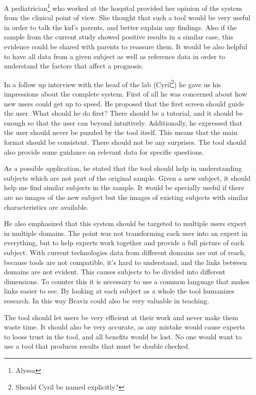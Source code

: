 A pediatrician\footnote{Alyssa} who worked at the hospital provided her opinion of the system from the clinical point of view. She thought that such a tool would be very useful in order to talk the kid's parents, and better explain any findings. Also if the sample from the current study showed positive results in a similar case, this evidence could be shared with parents to reassure them. It would be also helpful to have all data from a given subject as well as reference data in order to understand the factors that affect a prognosis. 


In a follow up interview with the head of the lab (Cyril\footnote{Should Cyril be named explicitly?}) he gave us his impressions about the complete system. First of all he was concerned about how new users could get up to speed. He proposed that the first screen should guide the user. What should he do first? There should be a tutorial, and it should be enough so that the user can beyond intuitively. Additionally, he expressed that the user should never be puzzled by the tool itself. This means that the main format should be consistent. There should not be any surprises. The tool should also provide some guidance on relevant data for specific questions. 

As a possible application, he stated that the tool should help in understanding subjects which are not part of the original sample. Given a new subject, it should help me find similar subjects in the sample. It would be specially useful if there are no images of the new subject but the images of existing subjects with similar characteristics are available. 

He also emphasized that this system should be targeted to multiple users expert in multiple domains. The point was not transforming each user into an expert in everything, but to help experts work together and provide a full picture of each subject. With current technologies data from different domains are out of reach, because tools are not compatible, it's hard to understand, and the links between domains are not evident. This causes subjects to be divided into different dimensions. To counter this it is necessary to use a common language that makes links easier to see. By looking at each subject as a whole the tool humanizes research. In this way Braviz could also be very valuable in teaching. 

The tool should let users be very efficient at their work and never make them waste time. It should also be very accurate, as any mistake would cause experts to loose trust in the tool, and all benefits would be lost. No one would want to use a tool that produces results that must be double checked.

